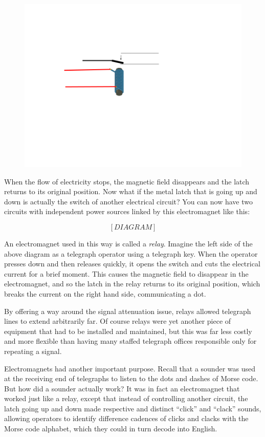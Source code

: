 \documentclass[UTF8]{book}
\begin{document}
\begin{CJK}{UTF8}{gbsn}
\begin{figure}[H]
\centering
\includegraphics[width=0.8\linewidth]{electromagnet_with_latch_2}
\end{figure}

When the flow of electricity stops, the magnetic field disappears and the latch returns to its original position. Now what if the metal latch that is going up and down is actually the switch of another electrical circuit? You can now have two circuits with independent power sources linked by this electromagnet like this:

\[ [DIAGRAM] \]

An electromagnet used in this way is called a \emph{relay}. Imagine the left side of the above diagram as a telegraph operator using a telegraph key. When the operator presses down and then releases quickly, it opens the switch and cuts the electrical current for a brief moment. This causes the magnetic field to disappear in the electromagnet, and so the latch in the relay returns to its original position, which breaks the current on the right hand side, communicating a dot.

By offering a way around the signal attenuation issue, relays allowed telegraph lines to extend arbitrarily far. Of course relays were yet another piece of equipment that had to be installed and maintained, but this was far less costly and more flexible than having many staffed telegraph offices responsible only for repeating a signal.

Electromagnets had another important purpose. Recall that a sounder was used at the receiving end of telegraphs to listen to the dots and dashes of Morse code. But how did a sounder actually work? It was in fact an electromagnet that worked just like a relay, except that instead of controlling another circuit, the latch going up and down made respective and distinct ``click'' and ``clack'' sounds, allowing operators to identify difference cadences of clicks and clacks with the Morse code alphabet, which they could in turn decode into English.


\end{CJK}
\end{document}
